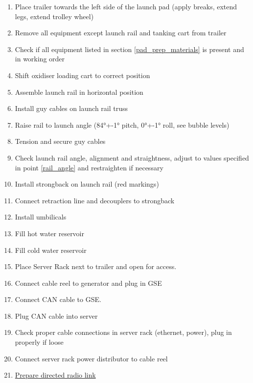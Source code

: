 \begin{enumerate}[label=PP\arabic*.]
    \item \label{pad_prep_start} Place trailer towards the left side of the launch pad (apply breaks, extend legs, extend trolley wheel)\checkbox
    \item Remove all equipment except launch rail and tanking cart from trailer \checkbox
    \item Check if all equipment listed in section \ref{pad_prep_materials} is present and in working order \checkbox
    \item Shift oxidiser loading cart to correct position \checkbox
    \item Assemble launch rail in horizontal position \checkbox
    \item Install guy cables on launch rail truss \checkbox
    \item \label{rail_angle} Raise rail to launch angle \newline(84°+-1° pitch, 0°+-1° roll, see bubble levels) \checkbox
    \item Tension and secure guy cables \checkbox
    \item Check launch rail angle, alignment and straightness, adjust to values specified in point \ref{rail_angle} and restraighten if necessary \checkbox
    \item Install strongback on launch rail (red markings) \checkbox
    \item Connect retraction line and decouplers to strongback \checkbox
    \item Install umbilicals \checkbox
    \item Fill hot water reservoir \checkbox
    \item Fill cold water reservoir \checkbox
    \item \label{software_prep_start} Place Server Rack next to trailer and open for access.\checkbox
    \item Connect cable reel to generator and plug in GSE\checkbox
    \item Connect CAN cable to GSE.\checkbox
    \item Plug CAN cable into server\checkbox
    \item Check proper cable connections in server rack (ethernet, power), plug in properly if loose\checkbox
    \item Connect server rack power distributor to cable reel\checkbox
    \item \label{radio_link} \underline{Prepare directed radio link}
        \begin{enumerate}[label*=\arabic*.]

\end{enumerate}
\end{enumerate}
